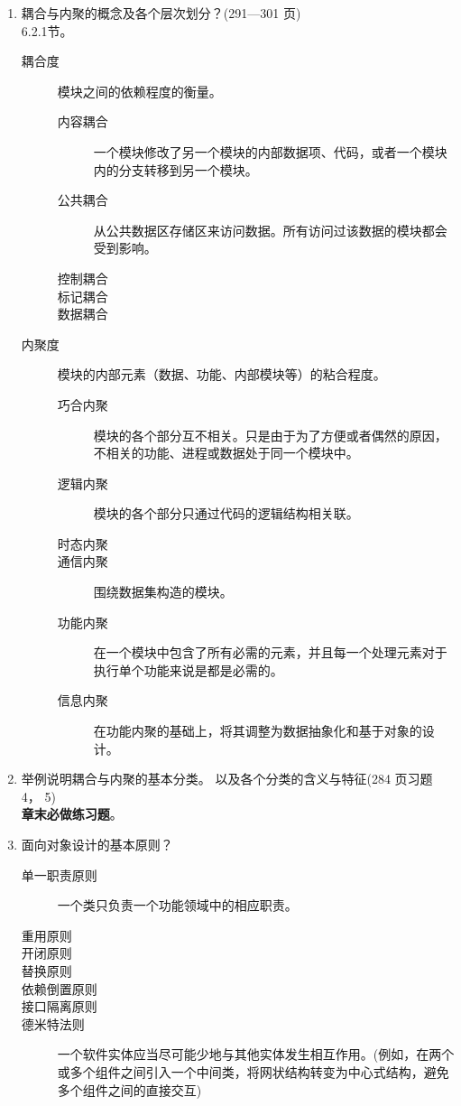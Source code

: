 \documentclass[14pt, letterpaper, UTF8, fontset=windowsnew, heading=true]{article}
\begin{document}
\begin{enumerate}
	\item 耦合与内聚的概念及各个层次划分？(291---301 页) \\
	6.2.1节。
	\begin{description}
		\item[耦合度] 模块之间的依赖程度的衡量。
			\begin{description}
				\item[内容耦合] 一个模块修改了另一个模块的内部数据项、代码，或者一个模块内的分支转移到另一个模块。
				\item[公共耦合] 从公共数据区存储区来访问数据。所有访问过该数据的模块都会受到影响。
				\item[控制耦合] 
				\item[标记耦合] 
				\item[数据耦合] 
			\end{description}
		\item[内聚度] 模块的内部元素（数据、功能、内部模块等）的粘合程度。
			\begin{description}
				\item[巧合内聚] 模块的各个部分互不相关。只是由于为了方便或者偶然的原因，不相关的功能、进程或数据处于同一个模块中。
				\item[逻辑内聚] 模块的各个部分只通过代码的逻辑结构相关联。
				\item[时态内聚] 
				\item[通信内聚] 围绕数据集构造的模块。
				\item[功能内聚] 在一个模块中包含了所有必需的元素，并且每一个处理元素对于执行单个功能来说是都是必需的。
				\item[信息内聚] 在功能内聚的基础上，将其调整为数据抽象化和基于对象的设计。
			\end{description}
	\end{description}
	
	\item 举例说明耦合与内聚的基本分类。 以及各个分类的含义与特征(284 页习题 4， 5) \\
	\textbf{章末必做练习题}。

%
	
	\item 面向对象设计的基本原则？
	\begin{description}
		\item[单一职责原则] 一个类只负责一个功能领域中的相应职责。
		\item[重用原则] 
		\item[开闭原则] 
		\item[替换原则] 
		\item[依赖倒置原则] 
		\item[接口隔离原则] 
		\item[德米特法则] 一个软件实体应当尽可能少地与其他实体发生相互作用。(例如，在两个或多个组件之间引入一个中间类，将网状结构转变为中心式结构，避免多个组件之间的直接交互)
	\end{description}
	

\end{enumerate}
\end{document}
